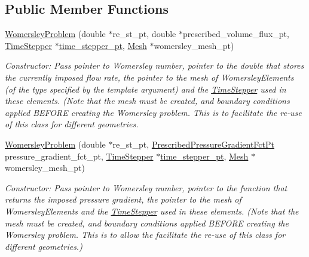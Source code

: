 \subsection*{Public Member Functions}
\begin{DoxyCompactItemize}
\item 
\hyperlink{classoomph_1_1WomersleyProblem_aa3b907c22d24bd76659a2f7c3b35c91a}{Womersley\+Problem} (double $\ast$re\+\_\+st\+\_\+pt, double $\ast$prescribed\+\_\+volume\+\_\+flux\+\_\+pt, \hyperlink{classoomph_1_1TimeStepper}{Time\+Stepper} $\ast$\hyperlink{classoomph_1_1Problem_acfdb74e8522fa5d486064998e7223fc6}{time\+\_\+stepper\+\_\+pt}, \hyperlink{classoomph_1_1Mesh}{Mesh} $\ast$womersley\+\_\+mesh\+\_\+pt)
\begin{DoxyCompactList}\small\item\em Constructor\+: Pass pointer to Womersley number, pointer to the double that stores the currently imposed flow rate, the pointer to the mesh of Womersley\+Elements (of the type specified by the template argument) and the \hyperlink{classoomph_1_1TimeStepper}{Time\+Stepper} used in these elements. (Note that the mesh must be created, and boundary conditions applied B\+E\+F\+O\+RE creating the Womersley problem. This is to facilitate the re-\/use of this class for different geometries. \end{DoxyCompactList}\item 
\hyperlink{classoomph_1_1WomersleyProblem_adc4074cd09df4505feb27e22abb6922a}{Womersley\+Problem} (double $\ast$re\+\_\+st\+\_\+pt, \hyperlink{classoomph_1_1WomersleyProblem_ac3607d12a92dede9ed2e93ae64f300b3}{Prescribed\+Pressure\+Gradient\+Fct\+Pt} pressure\+\_\+gradient\+\_\+fct\+\_\+pt, \hyperlink{classoomph_1_1TimeStepper}{Time\+Stepper} $\ast$\hyperlink{classoomph_1_1Problem_acfdb74e8522fa5d486064998e7223fc6}{time\+\_\+stepper\+\_\+pt}, \hyperlink{classoomph_1_1Mesh}{Mesh} $\ast$womersley\+\_\+mesh\+\_\+pt)
\begin{DoxyCompactList}\small\item\em Constructor\+: Pass pointer to Womersley number, pointer to the function that returns the imposed pressure gradient, the pointer to the mesh of Womersley\+Elements and the \hyperlink{classoomph_1_1TimeStepper}{Time\+Stepper} used in these elements. (Note that the mesh must be created, and boundary conditions applied B\+E\+F\+O\+RE creating the Womersley problem. This is to allow the facilitate the re-\/use of this class for different geometries.) \end{DoxyCompactList}\item 

\end{DoxyCompactItemize}
